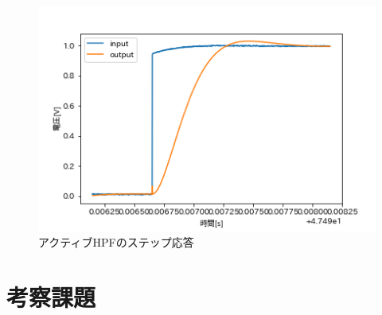 \documentclass[dvipdfmx, twocolumn]{jsarticle}
\begin{document}
\begin{enumerate}
\begin{itemize}
\begin{figure}[H]
\begin{center}
\includegraphics[scale = 0.5]{WactL.png}
\caption{アクティブHPFのステップ応答}
\end{center}
\end{figure}

\end{itemize}

\end{enumerate}

\section{考察課題}
\end{document}
